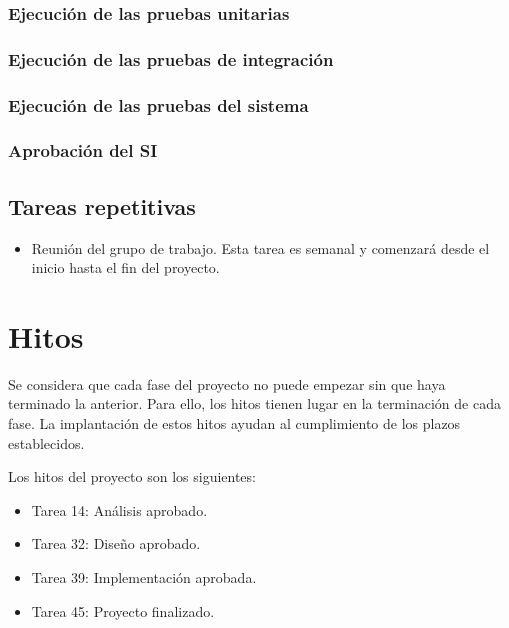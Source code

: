 \documentclass[11pt,a4paper,spanish,twoside]{book}
\begin{document}
\subsubsection{Ejecución de las pruebas unitarias}
\subsubsection{Ejecución de las pruebas de integración}
\subsubsection{Ejecución de las pruebas del sistema}
\subsubsection{Aprobación del SI}

\subsection{Tareas repetitivas}
  \begin{itemize}
  \item Reunión del grupo de trabajo. Esta tarea es semanal y comenzará desde
    el inicio hasta el fin del proyecto.
  \end{itemize}
\section{Hitos}
Se considera que cada fase del proyecto no puede empezar sin que haya
terminado la anterior. Para ello, los hitos tienen lugar en la terminación de
cada fase. La implantación de estos hitos ayudan al cumplimiento de los
plazos establecidos.

Los hitos del proyecto son los siguientes:
\begin{itemize}
\item Tarea 14: Análisis aprobado.
\item Tarea 32: Diseño aprobado.
\item Tarea 39: Implementación aprobada.
\item Tarea 45: Proyecto finalizado.
\end{itemize}
\end{document}
